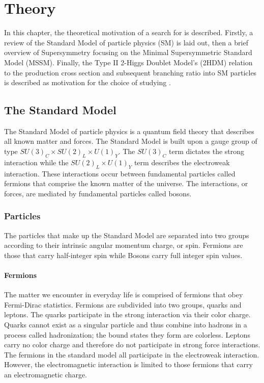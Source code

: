 \chapter{Theory}
    In this chapter, the theoretical motivation of a search for \HpLong is described. Firstly, a review of the Standard Model of particle physics (SM) is laid out, then a brief overview of Supersymmetry focusing on the Minimal Supersymmetric Standard Model (MSSM). Finally, the Type II 2-Higgs Doublet Model's (2HDM) relation to the \Hp production cross section and subsequent branching ratio into SM particles is described as motivation for the choice of studying \HpLong.

\section{The Standard Model}
	 The Standard Model of particle physics is a quantum field theory that describes all known matter and forces. The Standard Model is built upon a gauge group of type $SU(3)_C \times SU(2)_L \times U(1)_Y$. The $SU(3)_C$ term dictates the strong interaction while the $SU(2)_L \times U(1)_Y$ term describes the electroweak interaction. These interactions occur between fundamental particles called fermions that comprise the known matter of the universe. The interactions, or forces, are mediated by fundamental particles called bosons. 

	\subsection{Particles}        
		The particles that make up the Standard Model are separated into two groups according to their intrinsic angular momentum charge, or spin. Fermions are those that carry half-integer spin while Bosons carry full integer spin values.

		
		\subsubsection{Fermions}	
			The matter we encounter in everyday life is comprised of fermions that obey Fermi-Dirac statistics. Fermions are subdivided into two groups, quarks and leptons. The quarks participate in the strong interaction via their color charge. Quarks cannot exist as a singular particle and thus combine into hadrons in a process called hadronization; the bound states they form are colorless. Leptons carry no color charge and therefore do not participate in strong force interactions. The fermions in the standard model all participate in the electroweak interaction. However, the electromagnetic interaction is limited to those fermions that carry an electromagnetic charge.

